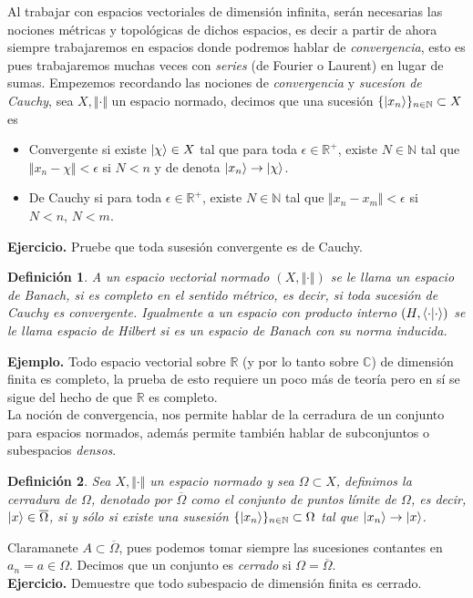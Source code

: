 \documentclass[letterpaper]{book}
\newtheorem{def.}{Definici\'on}[section]
\newcommand{\nat}{\ensuremath{ \mathbb N }}
\newcommand{\exe}{{\noindent \sc \textbf{Ejercicio. }}}
\newcommand{\eje}{{\noindent \sc \textbf{Ejemplo. }}}
\newcommand{\om}{\ensuremath{\Omega}}
\newcommand{\co}{\ensuremath{\mathbb C }}
\newcommand{\re}{\ensuremath{\mathbb R }}
\begin{document}
\noindent Al trabajar con espacios vectoriales de dimensión infinita, serán necesarias las nociones métricas y topológicas de dichos espacios, es decir a partir de ahora siempre trabajaremos en espacios donde podremos hablar de \emph{convergencia}, esto es pues trabajaremos muchas veces con \emph{series} (de Fourier o Laurent) en lugar de sumas.
Empezemos recordando las nociones de \emph{convergencia} y \emph{sucesíon de Cauchy}, sea \(X,\Vert\cdot\Vert\) un espacio normado, decimos que una sucesión \(\{\ket{x_n}\}_{n\in\nat}\subset X\) es
\begin{itemize}
  \item Convergente si existe \(\ket{\chi}\in X\) tal que para toda \(\epsilon\in\re^{+}\), existe \(N\in\nat\) tal que \(\Vert x_n-\chi\Vert<\epsilon\) si \(N<n\) y de denota \(\ket{x_n}\rightarrow\ket{\chi}\).
  \item De Cauchy si para toda \(\epsilon\in\re^{+}\), existe \(N\in\nat\) tal que \(\Vert x_n-x_m\Vert<\epsilon\) si \(N<n,\,N<m\).
  \end{itemize}
\exe Pruebe que toda susesión convergente es de Cauchy.
\begin{def.}
  A un espacio vectorial normado \((X,\Vert\cdot\Vert)\) se le llama un \emph{espacio de Banach}, si es completo en el sentido métrico, es decir, si toda sucesión de Cauchy es convergente. Igualmente a un espacio con producto interno \((H,\braket{\cdot|\cdot})\) se le llama \emph{espacio de Hilbert} si es un espacio de Banach con su norma inducida.
  \end{def.}
\eje Todo espacio vectorial sobre \(\re\) (y por lo tanto sobre \(\co\)) de dimensión finita es completo, la prueba de esto requiere un poco más de teoría pero en sí se sigue del hecho de que \(\re\) es completo.\\
La noción de convergencia, nos permite hablar de la cerradura de un conjunto para espacios normados, además permite también hablar de subconjuntos o subespacios \emph{densos}.
\begin{def.}
  Sea \(X,\Vert\cdot\Vert\) un espacio normado y sea \(\om\subset X\), definimos la cerradura de \(\om\), denotado por \(\overline{\om}\) como el conjunto de puntos límite de \(\om\), es decir, \(\ket{x}\in\overline{\om}\), si y sólo si existe una susesión \(\{\ket{x_n}\}_{n\in\nat}\subset\om\) tal que \(\ket{x_n}\rightarrow\ket{x}\).
  \end{def.}
Claramanete \(A\subset\overline{\om}\), pues podemos tomar siempre las sucesiones contantes en \(a_n=a\in\om\). Decimos que un conjunto es \emph{cerrado} si \(\om=\overline{\om}\).\\
\exe Demuestre que todo subespacio de dimensión finita es cerrado.\\
\end{document}
